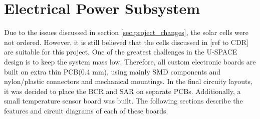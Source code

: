 \section{Electrical Power Subsystem}
%
Due to the issues discussed in section \ref{sec:project_changes}, the solar cells were not ordered. However, it is still believed that the cells discussed in [ref to CDR] are suitable for this project.
%
One of the greatest challenges in the U-SPACE design is to keep the system mass low. Therefore, all custom electronic boards are built on extra thin \ac{PCB}(0.4 mm), using mainly \ac{SMD} components and nylon/plastic connectors and mechanical mountings.
%
In the final circuity layouts, it was decided to place the \ac{BCR} and \ac{SAR} on separate \acp{PCB}. Additionally, a small temperature sensor board was built. The following sections describe the features and circuit diagrams of each of these boards.
%
%
%
